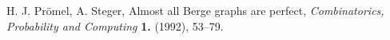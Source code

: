  H. J. Pr\"omel, A. Steger, Almost all Berge graphs are perfect, {\em Combinatorics, Probability and Computing} {\bf 1.} (1992), 53--79.
